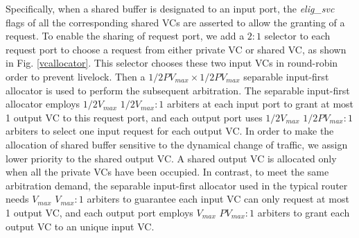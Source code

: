 \documentclass[10pt,conference]{IEEEtran}
\begin{document}
Specifically, when a shared buffer is designated to an input port, the \emph{elig\_svc} flags of all the corresponding shared VCs are asserted to allow the granting of a request. To enable the sharing of request port, we add a $2:1$ selector to each request port to choose a request from either private VC or shared VC, as shown in Fig. \ref{vcallocator}. This selector chooses these two input VCs in round-robin order to prevent livelock. Then a $1/2PV_{max}\times 1/2PV_{max}$ separable input-first allocator \cite{DaTo04} is used to perform the subsequent arbitration. The separable input-first allocator employs $1/2V_{max}$ $1/2V_{max}:1$ arbiters at each input port to grant at most 1 output VC to this request port, and each output port uses $1/2V_{max}$ $1/2PV_{max}:1$ arbiters to select one input request for each output VC. In order to make the allocation of shared buffer sensitive to the dynamical change of traffic, we assign lower priority to the shared output VC. A shared output VC is allocated only when all the private VCs have been occupied. In contrast, to meet the same arbitration demand, the separable input-first allocator used in the typical router needs $V_{max}$ $V_{max}:1$ arbiters to guarantee each input VC can only request at most 1 output VC, and each output port employs $V_{max}$ $PV_{max}:1$ arbiters to grant each output VC to an unique input VC.

\end{document}
